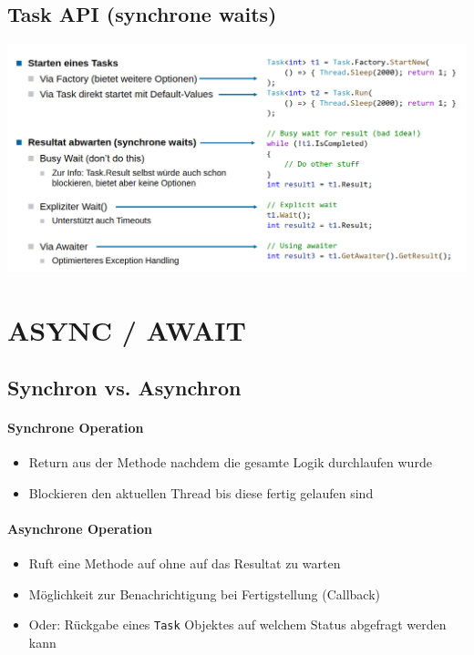 \documentclass[
a4paper,
oneside,
10pt,
fleqn,
headsepline,
toc=listofnumbered, 
bibliography=totocnumbered]{scrartcl}
\let\stdsection\section
\renewcommand\section{\clearpage\stdsection}
\begin{document}
\subsection{Task API (synchrone waits)}
\begin{minipage}[t]{1\textwidth}
	\centering
	\includegraphics[width=1\linewidth]{images/task-api.png}
\end{minipage}

\section{ASYNC / AWAIT}
\subsection{Synchron vs. Asynchron}
\paragraph{Synchrone Operation}
\begin{itemize}
	\item Return aus der Methode nachdem die gesamte Logik durchlaufen wurde
	\item Blockieren den aktuellen Thread bis diese fertig gelaufen sind
\end{itemize}
\paragraph{Asynchrone Operation}
\begin{itemize}
	\item Ruft eine Methode auf ohne auf das Resultat zu warten
	\item Möglichkeit zur Benachrichtigung bei Fertigstellung (Callback)
	\item Oder: Rückgabe eines \lstinline|Task| Objektes auf welchem Status abgefragt werden kann
\end{itemize}
\end{document}
